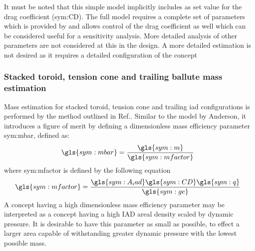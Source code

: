  It must be noted that this simple model implicitly includes as set value for the drag coefficient (\gls{sym:CD}). The full model requires a complete set of parameters which is provided by \cite{Anderson1969} and allows control of the drag coefficient as well which can be considered useful for a sensitivity analysis. More detailed analysis of other parameters are not considered at this in the design. A more detailed estimation is not desired as it requires a detailed configuration of the concept
\subsubsection{Stacked toroid, tension cone and trailing ballute mass estimation}
Mass estimation for stacked toroid, tension cone and trailing \gls{iad} configurations is performed by the method outlined in Ref.\cite{Samareh2011}. Similar to the model by Anderson, it introduces a figure of merit by defining a dimensionless mass efficiency parameter \gls{sym:mbar}, defined as:
\begin{equation}
\gls{sym:mbar} = \frac{\gls{sym:m}}{\gls{sym:mfactor}}
\label{eq:dimmass}
\end{equation}
where \gls{sym:mfactor} is defined by the following equation
\begin{equation}
\gls{sym:mfactor} = \frac{\gls{sym:A_iad} \gls{sym:CD} \gls{sym:q}}{\gls{sym:ge}}
\label{eq:mfactor}
\end{equation}
A concept having a high dimensionless mass efficiency parameter may be interpreted as a concept having a high IAD areal density scaled by dynamic pressure. It is desirable to have this parameter as small as possible, to effect a larger area capable of withstanding greater dynamic pressure with the lowest possible mass.

